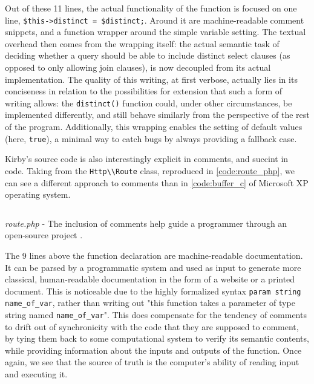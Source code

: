 Out of these 11 lines, the actual functionality of the function is focused on one line, \lstinline{$this->distinct = $distinct;}. Around it are machine-readable comment snippets, and a function wrapper around the simple variable setting. The textual overhead then comes from the wrapping itself: the actual semantic task of deciding whether a query should be able to include distinct select clauses (as opposed to only allowing join clauses), is now decoupled from its actual implementation. The quality of this writing, at first verbose, actually lies in its conciseness in relation to the possibilities for extension that such a form of writing allows: the \lstinline{distinct()} function could, under other circumstances, be implemented differently, and still behave similarly from the perspective of the rest of the program. Additionally, this wrapping enables the setting of default values (here, \lstinline{true}), a minimal way to catch bugs by always providing a fallback case.

Kirby's source code is also interestingly explicit in comments, and succint in code. Taking from the \lstinline{Http\\Route} class, reproduced in \autoref{code:route_php}, we can see a different approach to comments than in \autoref{code:buffer_c} of Microsoft XP operating system.

\begin{listing}
  \inputminted{php}{./corpus/route.php}
  \caption{\emph{route.php} - The inclusion of comments help guide a programmer through an open-source project \citep{allgeier_route_2021}.}
  \label{code:route_php}
\end{listing}

The 9 lines above the function declaration are machine-readable documentation. It can be parsed by a programmatic system and used as input to generate more classical, human-readable documentation in the form of a website or a printed document. This is noticeable due to the highly formalized syntax \lstinline{param string name_of_var}, rather than writing out "this function takes a parameter of type string named \lstinline{name_of_var}". This does compensate for the tendency of comments to drift out of synchronicity with the code that they are supposed to comment, by tying them back to some computational system to verify its semantic contents, while providing information about the inputs and outputs of the function. Once again, we see that the source of truth is the computer's ability of reading input and executing it.

